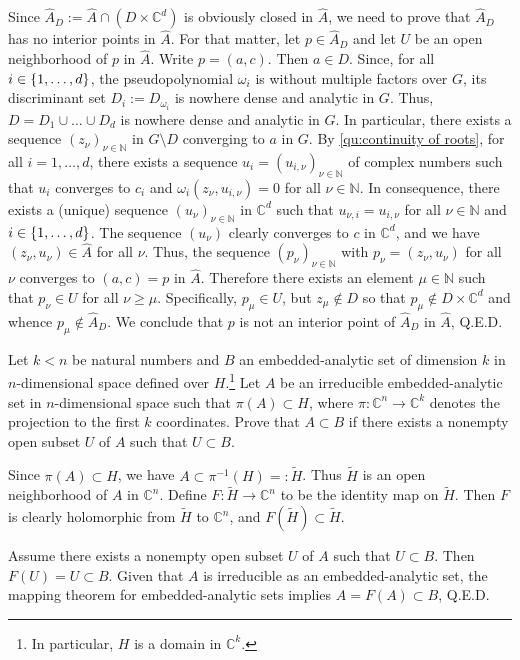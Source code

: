 \documentclass[a4paper]{amsart}
\newcommand{\N}{\mathbb{N}}
\newcommand{\C}{\mathbb{C}}
\theoremstyle{remark}
\numberwithin{equation}{question}
\DeclarePairedDelimiter\set{\{}{\}}
\begin{document}
\begin{solution}%
Since $\hat A_D := \hat A \cap (D \times \C^d)$ is obviously closed in $\hat A$, we need to prove that $\hat A_D$ has no interior points in $\hat A$. For that matter, let $p \in \hat A_D$ and let $U$ be an open neighborhood of $p$ in $\hat A$. Write $p = (a,c)$. Then $a \in D$. Since, for all $i \in \set{1,\dots,d}$, the pseudopolynomial $\omega_i$ is without multiple factors over $G$, its discriminant set $D_i := D_{\omega_i}$ is nowhere dense and analytic in $G$. Thus, $D = D_1 \cup \dots \cup D_d$ is nowhere dense and analytic in $G$. In particular, there exists a sequence $(z_\nu)_{\nu \in \N}$ in $G \setminus D$ converging to $a$ in $G$. By \cref{qu:continuity of roots}, for all $i = 1,\dots,d$, there exists a sequence $u_i = (u_{i,\nu})_{\nu \in \N}$ of complex numbers such that $u_i$ converges to $c_i$ and $\omega_i(z_\nu,u_{i,\nu}) = 0$ for all $\nu \in \N$. In consequence, there exists a (unique) sequence $(u_\nu)_{\nu \in \N}$ in $\C^d$ such that $u_{\nu,i} = u_{i,\nu}$ for all $\nu \in \N$ and $i \in \set{1,\dots,d}$. The sequence $(u_\nu)$ clearly converges to $c$ in $\C^d$, and we have $(z_\nu,u_\nu) \in \hat A$ for all $\nu$. Thus, the sequence $(p_\nu)_{\nu \in \N}$ with $p_\nu = (z_\nu,u_\nu)$ for all $\nu$ converges to $(a,c) = p$ in $\hat A$. Therefore there exists an element $\mu \in \N$ such that $p_\nu \in U$ for all $\nu \ge \mu$. Specifically, $p_\mu \in U$, but $z_\mu \notin D$ so that $p_\mu \notin D \times \C^d$ and whence $p_\mu \notin \hat A_D$. We conclude that $p$ is not an interior point of $\hat A_D$ in $\hat A$, Q.E.D.
\end{solution}

\begin{question}[subtitle=An identity theorem for embedded-analytic sets]
\label{qu:identity theorem}
Let $k<n$ be natural numbers and $B$ an embedded-analytic set of dimension $k$ in $n$-dimensional space defined over $H$.\footnote{In particular, $H$ is a domain in $\C^k$.} Let $A$ be an irreducible embedded-analytic set in $n$-dimensional space such that $\pi(A) \subset H$, where $\pi \colon \C^n \to \C^k$ denotes the projection to the first $k$ coordinates. Prove that $A \subset B$ if there exists a nonempty open subset $U$ of $A$ such that $U \subset B$.
\end{question}

\begin{solution}%
Since $\pi(A) \subset H$, we have $A \subset \pi^{-1}(H) =: \tilde H$. Thus $\tilde H$ is an open neighborhood of $A$ in $\C^n$. Define $F \colon \tilde H \to \C^n$ to be the identity map on $\tilde H$. Then $F$ is clearly holomorphic from $\tilde H$ to $\C^n$, and $F(\tilde H) \subset \tilde H$.

Assume there exists a nonempty open subset $U$ of $A$ such that $U \subset B$. Then $F(U) = U \subset B$. Given that $A$ is irreducible as an embedded-analytic set, the mapping theorem for embedded-analytic sets implies $A = F(A) \subset B$, Q.E.D.
\end{solution}
\end{document}
